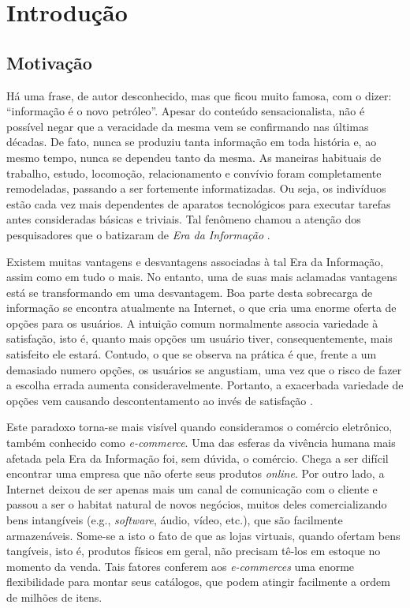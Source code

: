 \chapter{Introdução}
\section{Motivação}

Há uma frase, de autor desconhecido, mas que ficou muito famosa, com o dizer: ``informação é o novo petróleo''. Apesar do conteúdo sensacionalista, não é possível negar que a veracidade da mesma vem se confirmando nas últimas décadas. De fato, nunca se produziu tanta informação em toda história e, ao mesmo tempo, nunca se dependeu tanto da mesma. As maneiras habituais de trabalho, estudo, locomoção, relacionamento e convívio foram completamente remodeladas, passando a ser fortemente informatizadas. Ou seja, os indivíduos estão cada vez mais dependentes de aparatos tecnológicos para executar tarefas antes consideradas básicas e triviais. Tal fenômeno chamou a atenção dos pesquisadores que o batizaram de \textit{Era da Informação} \citep{castells_information_1999}.

Existem muitas vantagens e desvantagens associadas à tal Era da Informação, assim como em tudo o mais. No entanto, uma de suas mais aclamadas vantagens está se transformando em uma desvantagem. Boa parte desta sobrecarga de informação se encontra atualmente na Internet, o que cria uma enorme oferta de opções para os usuários. A intuição comum normalmente associa variedade à satisfação, isto é, quanto mais opções um usuário tiver, consequentemente, mais satisfeito ele estará. Contudo, o que se observa na prática é que, frente a um demasiado numero opções, os usuários se angustiam, uma vez que o risco de fazer a escolha errada aumenta consideravelmente. Portanto, a exacerbada variedade de opções vem causando descontentamento ao invés de satisfação \citep{schwartz_paradox_2004}.

Este paradoxo torna-se mais visível quando consideramos o comércio eletrônico, também conhecido como \textit{e-commerce}. Uma das esferas da vivência humana mais afetada pela Era da Informação foi, sem dúvida, o comércio. Chega a ser difícil encontrar uma empresa que não oferte seus produtos \textit{online}. Por outro lado, a Internet deixou de ser apenas mais um canal de comunicação com o cliente e passou a ser o habitat natural de novos negócios, muitos deles comercializando bens intangíveis (e.g., \textit{software}, áudio, vídeo, etc.), que são facilmente armazenáveis. Some-se a isto o fato de que as lojas virtuais, quando ofertam bens tangíveis, isto é, produtos físicos em geral, não precisam tê-los em estoque no momento da venda. Tais fatores conferem aos \textit{e-commerces} uma enorme flexibilidade para montar seus catálogos, que podem atingir facilmente a ordem de milhões de itens.

